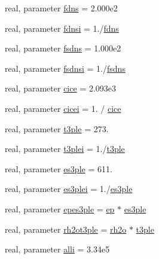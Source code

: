 \begin{DoxyCompactItemize}
\item 
real, parameter \hyperlink{namespaceconsts__coms_a410d70e87edda0633a3eae3390fb500e}{fdns} = 2.\+000e2
\item 
real, parameter \hyperlink{namespaceconsts__coms_ae51d569a4dc215678ec17d04f52645b4}{fdnsi} = 1./\hyperlink{namespaceconsts__coms_a410d70e87edda0633a3eae3390fb500e}{fdns}
\item 
real, parameter \hyperlink{namespaceconsts__coms_a2fcb787deb1df9a72dae0339dd8143a5}{fsdns} = 1.\+000e2
\item 
real, parameter \hyperlink{namespaceconsts__coms_a75c6813a29c7acfe89551da232b96078}{fsdnsi} = 1./\hyperlink{namespaceconsts__coms_a2fcb787deb1df9a72dae0339dd8143a5}{fsdns}
\item 
real, parameter \hyperlink{namespaceconsts__coms_ae49393979194289765ba196f2ac2e000}{cice} = 2.\+093e3
\item 
real, parameter \hyperlink{namespaceconsts__coms_a090b60028f7eece2f3e31fdafb782241}{cicei} = 1. / \hyperlink{namespaceconsts__coms_ae49393979194289765ba196f2ac2e000}{cice}
\item 
real, parameter \hyperlink{namespaceconsts__coms_aed2b23708875a89de5f372ecc4299dd4}{t3ple} = 273.
\item 
real, parameter \hyperlink{namespaceconsts__coms_a091ec81cfeedd9148a6f44471936ab4f}{t3plei} = 1./\hyperlink{namespaceconsts__coms_aed2b23708875a89de5f372ecc4299dd4}{t3ple}
\item 
real, parameter \hyperlink{namespaceconsts__coms_acce85d2ba9f93e18b505d97bffd4a453}{es3ple} = 611.
\item 
real, parameter \hyperlink{namespaceconsts__coms_ae5b40232ff74fe2d9258b854fe070dc6}{es3plei} = 1./\hyperlink{namespaceconsts__coms_acce85d2ba9f93e18b505d97bffd4a453}{es3ple}
\item 
real, parameter \hyperlink{namespaceconsts__coms_a12ac1017d17262aa7e40fa9a325273b9}{epes3ple} = \hyperlink{namespaceconsts__coms_a7c4e3129334941133aea2f4408d79a4c}{ep} $\ast$ \hyperlink{namespaceconsts__coms_acce85d2ba9f93e18b505d97bffd4a453}{es3ple}
\item 
real, parameter \hyperlink{namespaceconsts__coms_a59fef76536ae1c8cf0ed4067acdcebf4}{rh2ot3ple} = \hyperlink{namespaceconsts__coms_ac3c72bd757c228e71a76062364a19c06}{rh2o} $\ast$ \hyperlink{namespaceconsts__coms_aed2b23708875a89de5f372ecc4299dd4}{t3ple}
\item 
real, parameter \hyperlink{namespaceconsts__coms_aed7ce8242223a8b27f2052b3082e34d8}{alli} = 3.\+34e5
\item 

\end{DoxyCompactItemize}
